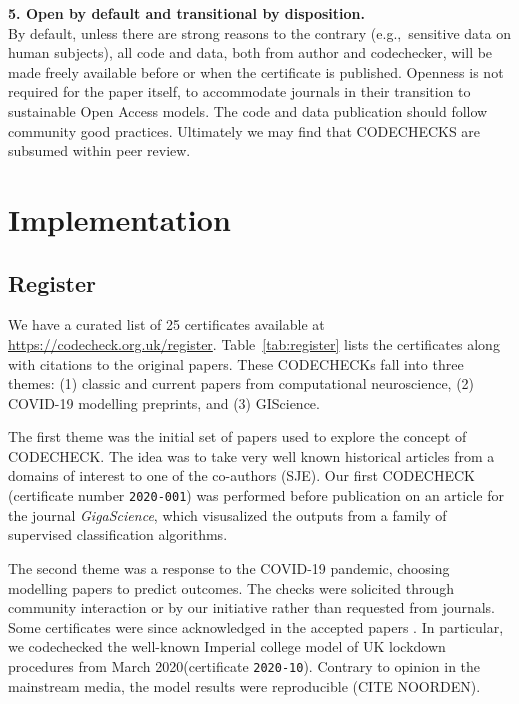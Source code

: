 \documentclass[12pt]{article}
\begin{document}
\textbf{5. Open by default and transitional by disposition.} \\
By default, unless there are strong reasons to the contrary
(e.g.,~sensitive data on human subjects), all code and data, both from
author and codechecker, will be made freely available before or when
the certificate is published.  Openness is not required for the paper
itself, to accommodate journals in their transition to sustainable
Open Access models.  The code and data publication should follow
community good practices.  Ultimately we may find that CODECHECKS are
subsumed within peer review.

\section*{Implementation}\label{implementation}

\subsection*{Register}\label{register}

We have a curated list of 25 certificates available at
\url{https://codecheck.org.uk/register}.
Table~\ref{tab:register} lists the certificates
along with citations to the original papers.
These CODECHECKs fall into three themes:
(1) classic and current papers from computational neuroscience,
(2) COVID-19 modelling preprints, and
(3) GIScience.

The first theme was the initial set of papers used to explore the
concept of CODECHECK.  The idea was to take very well known historical
articles from a domains of interest to one of the co-authors (SJE).
Our first CODECHECK (certificate number \texttt{2020-001}) was
performed before publication on an article for the journal
\emph{GigaScience}, which visusalized the outputs from a family of
supervised classification algorithms.


The second theme was a response to the COVID-19 pandemic, choosing
modelling papers to predict outcomes. The checks were solicited
through community interaction or by our initiative rather than
requested from journals.  Some certificates were since acknowledged in
the accepted papers
\cite{Davies2020-vj,kucharski_effectiveness_2020}. In particular, we
codechecked the well-known Imperial college model of UK lockdown
procedures from March 2020(certificate \texttt{2020-10}).  Contrary to
opinion in the mainstream media, the model results were reproducible
(CITE NOORDEN).
\end{document}
